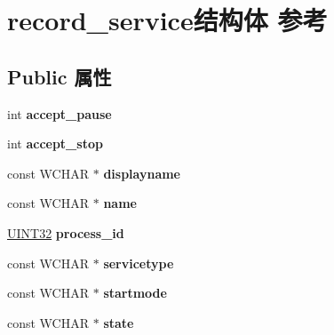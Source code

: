 \hypertarget{structrecord__service}{}\section{record\+\_\+service结构体 参考}
\label{structrecord__service}
\subsection*{Public 属性}
\begin{DoxyCompactItemize}
\item 
\mbox{\label{structrecord__service_a99faae9444754c5b5b6a3a7dd2951d25}} 
int {\bfseries accept\+\_\+pause}
\item 
\mbox{\label{structrecord__service_a5c7da8572d28c4bac0a1b7819894c3d9}} 
int {\bfseries accept\+\_\+stop}
\item 
\mbox{\label{structrecord__service_a0fc71a7b742c548944d6071557329c48}} 
const W\+C\+H\+AR $\ast$ {\bfseries displayname}
\item 
\mbox{\label{structrecord__service_afc0a6cf8d7580f18dcccd73f22ae7336}} 
const W\+C\+H\+AR $\ast$ {\bfseries name}
\item 
\mbox{\label{structrecord__service_ad27769434f1cd69d67dd953938e416f5}} 
\hyperlink{_processor_bind_8h_ae1e6edbbc26d6fbc71a90190d0266018}{U\+I\+N\+T32} {\bfseries process\+\_\+id}
\item 
\mbox{\label{structrecord__service_a3aee3d82372ca72d92a05ab55a972552}} 
const W\+C\+H\+AR $\ast$ {\bfseries servicetype}
\item 
\mbox{\label{structrecord__service_a17a64c340d14d1ba8a0cf0bf52e82cd4}} 
const W\+C\+H\+AR $\ast$ {\bfseries startmode}
\item 
\mbox{\label{structrecord__service_a431800e30b44ae62bde843670ae79c2e}} 
const W\+C\+H\+AR $\ast$ {\bfseries state}
\item 
\mbox{\label{structrecord__service_a50f547070df5c16816c8c26ce158bb33}} 

\end{DoxyCompactItemize}
